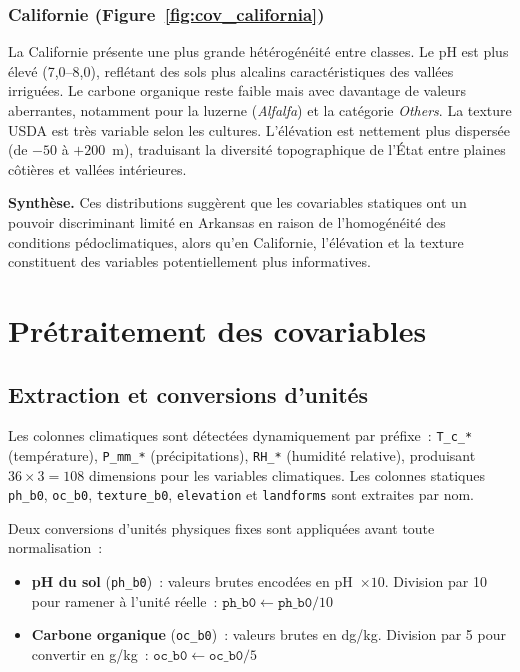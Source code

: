 \subsubsection*{Californie (Figure~\ref{fig:cov_california})}

La Californie présente une plus grande hétérogénéité entre classes. Le pH est plus élevé
(7{,}0--8{,}0), reflétant des sols plus alcalins caractéristiques des vallées irriguées.
Le carbone organique reste faible mais avec davantage de valeurs aberrantes, notamment pour
la luzerne (\textit{Alfalfa}) et la catégorie \textit{Others}. La texture USDA est très
variable selon les cultures. L'élévation est nettement plus dispersée (de $-50$ à $+200$~m),
traduisant la diversité topographique de l'État entre plaines côtières et vallées intérieures.

\medskip
\noindent\textbf{Synthèse.} Ces distributions suggèrent que les covariables statiques ont
un pouvoir discriminant limité en Arkansas en raison de l'homogénéité des conditions
pédoclimatiques, alors qu'en Californie, l'élévation et la texture constituent des
variables potentiellement plus informatives.

\section{Prétraitement des covariables}

\subsection{Extraction et conversions d'unités}

Les colonnes climatiques sont détectées dynamiquement par préfixe~:
\texttt{T\_c\_*} (température), \texttt{P\_mm\_*} (précipitations), \texttt{RH\_*}
(humidité relative), produisant $36 \times 3 = 108$ dimensions pour les variables
climatiques. Les colonnes statiques \texttt{ph\_b0}, \texttt{oc\_b0},
\texttt{texture\_b0}, \texttt{elevation} et \texttt{landforms} sont extraites par nom.

Deux conversions d'unités physiques fixes sont appliquées avant toute normalisation~:

\begin{itemize}
    \item \textbf{pH du sol} (\texttt{ph\_b0})~: valeurs brutes encodées en pH~$\times 10$.
    Division par 10 pour ramener à l'unité réelle~: $\texttt{ph\_b0} \leftarrow \texttt{ph\_b0} / 10$
    \item \textbf{Carbone organique} (\texttt{oc\_b0})~: valeurs brutes en dg/kg.
    Division par 5 pour convertir en g/kg~: $\texttt{oc\_b0} \leftarrow \texttt{oc\_b0} / 5$
\end{itemize}

